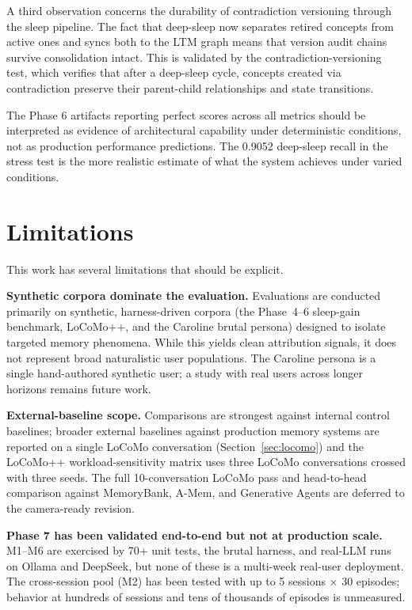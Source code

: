 \documentclass[11pt,twocolumn]{article}
\begin{document}
A third observation concerns the durability of contradiction versioning through the sleep pipeline. The fact that deep-sleep now separates retired concepts from active ones and syncs both to the LTM graph means that version audit chains survive consolidation intact. This is validated by the contradiction-versioning test, which verifies that after a deep-sleep cycle, concepts created via contradiction preserve their parent-child relationships and state transitions.

The Phase 6 artifacts reporting perfect scores across all metrics should be interpreted as evidence of architectural capability under deterministic conditions, not as production performance predictions. The 0.9052 deep-sleep recall in the stress test is the more realistic estimate of what the system achieves under varied conditions.

\section{Limitations}
\label{sec:limitations}

This work has several limitations that should be explicit.

\textbf{Synthetic corpora dominate the evaluation.} Evaluations are conducted primarily on synthetic, harness-driven corpora (the Phase~4--6 sleep-gain benchmark, LoCoMo++, and the Caroline brutal persona) designed to isolate targeted memory phenomena. While this yields clean attribution signals, it does not represent broad naturalistic user populations. The Caroline persona is a single hand-authored synthetic user; a study with real users across longer horizons remains future work.

\textbf{External-baseline scope.} Comparisons are strongest against internal control baselines; broader external baselines against production memory systems are reported on a single LoCoMo conversation (Section~\ref{sec:locomo}) and the LoCoMo++ workload-sensitivity matrix uses three LoCoMo conversations crossed with three seeds. The full 10-conversation LoCoMo pass and head-to-head comparison against MemoryBank, A-Mem, and Generative Agents are deferred to the camera-ready revision.

\textbf{Phase 7 has been validated end-to-end but not at production scale.} M1--M6 are exercised by 70+ unit tests, the brutal harness, and real-LLM runs on Ollama and DeepSeek, but none of these is a multi-week real-user deployment. The cross-session pool (M2) has been tested with up to 5 sessions $\times$ 30 episodes; behavior at hundreds of sessions and tens of thousands of episodes is unmeasured.
\end{document}
